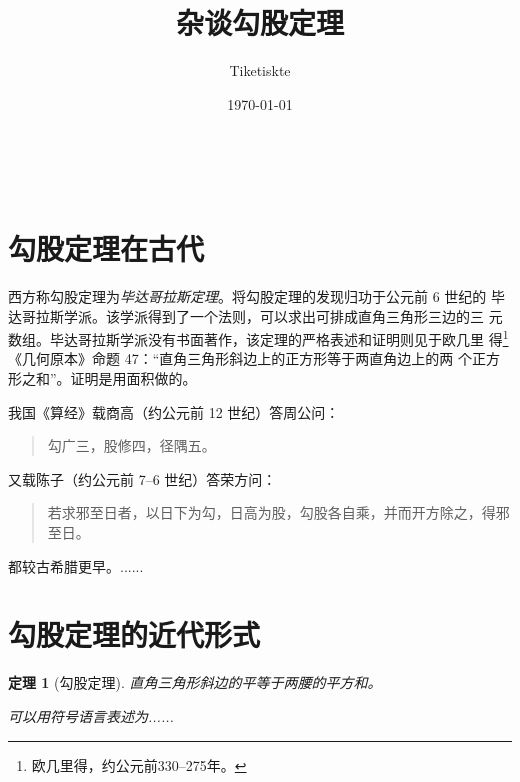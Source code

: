 \documentclass[UTF8]{ctexart} %
\title{杂谈勾股定理}
\author{Tiketiskte}
\date{\today}
\newtheorem{thm}{定理}
\begin{document}

    \maketitle %
    \
    \tableofcontents %
    \section{勾股定理在古代} %
    西方称勾股定理为\emph{毕达哥拉斯定理}。将勾股定理的发现归功于公元前 6 世纪的
    毕达哥拉斯学派。该学派得到了一个法则，可以求出可排成直角三角形三边的三
    元数组。毕达哥拉斯学派没有书面著作，该定理的严格表述和证明则见于欧几里
    得\footnote{欧几里得，约公元前330--275年。}《几何原本》命题 47：“直角三角形斜边上的正方形等于两直角边上的两
    个正方形之和”。证明是用面积做的。

    我国《算经》载商高（约公元前 12 世纪）答周公问：
    \begin{quote}
        \kaishu
        勾广三，股修四，径隅五。
    \end{quote}
    又载陈子（约公元前 7--6 世纪）答荣方问：
    \begin{quote}
        \kaishu
        若求邪至日者，以日下为勾，日高为股，勾股各自乘，并而开方除之，得邪至日。
    \end{quote}
    都较古希腊更早。......
    \section{勾股定理的近代形式}
    \begin{thm}[勾股定理]
        直角三角形斜边的平等于两腰的平方和。

        可以用符号语言表述为......
    \end{thm}
    
\end{document}
